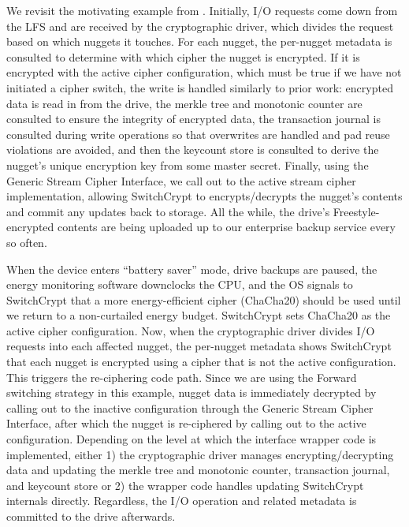 We revisit the motivating example from . Initially, I/O
requests come down from the LFS and are received by the cryptographic driver,
which divides the request based on which nuggets it touches. For each nugget,
the per-nugget metadata is consulted to determine with which cipher the nugget
is encrypted. If it is encrypted with the active cipher configuration, which
must be true if we have not initiated a cipher switch, the write is handled
similarly to prior work: encrypted data is read in from the drive, the merkle
tree and monotonic counter are consulted to ensure the integrity of encrypted
data, the transaction journal is consulted during write operations so that
overwrites are handled and pad reuse violations are avoided, and then the
keycount store is consulted to derive the nugget's unique encryption key from
some master secret. Finally, using the Generic Stream Cipher Interface, we call
out to the active stream cipher implementation, allowing SwitchCrypt to
encrypts/decrypts the nugget's contents and commit any updates back to storage.
All the while, the drive's Freestyle-encrypted contents are being uploaded up to
our enterprise backup service every so often. 

When the device enters ``battery saver'' mode, drive backups are paused, the
energy monitoring software downclocks the CPU, and the OS signals to SwitchCrypt
that a more energy-efficient cipher (ChaCha20) should be used until we return to
a non-curtailed energy budget. SwitchCrypt sets ChaCha20 as the active cipher
configuration. Now, when the cryptographic driver divides I/O requests into each
affected nugget, the per-nugget metadata shows SwitchCrypt that each nugget is
encrypted using a cipher that is not the active configuration. This triggers the
re-ciphering code path. Since we are using the Forward switching strategy in
this example, nugget data is immediately decrypted by calling out to the
inactive configuration through the Generic Stream Cipher Interface, after which
the nugget is re-ciphered by calling out to the active configuration. Depending
on the level at which the interface wrapper code is implemented, either 1) the
cryptographic driver manages encrypting/decrypting data and updating the merkle
tree and monotonic counter, transaction journal, and keycount store or 2) the
wrapper code handles updating SwitchCrypt internals directly. Regardless, the
I/O operation and related metadata is committed to the drive afterwards.

